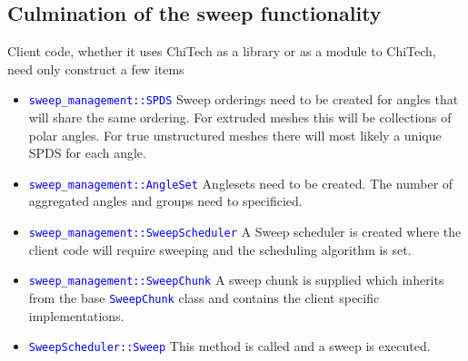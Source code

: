 \documentclass[11pt,letterpaper,titlepage]{article}
\newcommand{\xmltag}[1]{\textcolor{blue}{ \texttt{#1}} }
\numberwithin{equation}{section}
\begin{document}
\subsection{Culmination of the sweep functionality}
Client code, whether it uses ChiTech as a library or as a module to ChiTech, need only construct a few items
\begin{itemize}
\item \xmltag{sweep\_management::SPDS} Sweep orderings need to be created for angles that will share the same ordering. For extruded meshes this will be collections of polar angles. For true unstructured meshes there will most likely a unique SPDS for each angle.
\item \xmltag{sweep\_management::AngleSet} Anglesets need to be created. The number of aggregated angles and groups need to specificied.
\item \xmltag{sweep\_management::SweepScheduler} A Sweep scheduler is created where the client code will require sweeping and the scheduling algorithm is set.
\item \xmltag{sweep\_management::SweepChunk} A sweep chunk is supplied which inherits from the base  \xmltag{SweepChunk} class and contains the client specific implementations. 
\item \xmltag{SweepScheduler::Sweep} This method is called and a sweep is executed.
\end{itemize}
\end{document}
